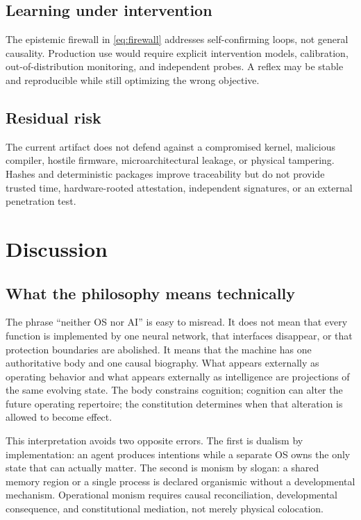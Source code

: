 \documentclass[journal,10pt]{IEEEtran}
\begin{document}
\subsection{Learning under intervention}
The epistemic firewall in \eqref{eq:firewall} addresses self-confirming loops, not general causality. Production use would require explicit intervention models, calibration, out-of-distribution monitoring, and independent probes. A reflex may be stable and reproducible while still optimizing the wrong objective.

\subsection{Residual risk}
The current artifact does not defend against a compromised kernel, malicious compiler, hostile firmware, microarchitectural leakage, or physical tampering. Hashes and deterministic packages improve traceability but do not provide trusted time, hardware-rooted attestation, independent signatures, or an external penetration test.

\section{Discussion}
\subsection{What the philosophy means technically}
The phrase ``neither OS nor AI'' is easy to misread. It does not mean that every function is implemented by one neural network, that interfaces disappear, or that protection boundaries are abolished. It means that the machine has one authoritative body and one causal biography. What appears externally as operating behavior and what appears externally as intelligence are projections of the same evolving state. The body constrains cognition; cognition can alter the future operating repertoire; the constitution determines when that alteration is allowed to become effect.

This interpretation avoids two opposite errors. The first is dualism by implementation: an agent produces intentions while a separate OS owns the only state that can actually matter. The second is monism by slogan: a shared memory region or a single process is declared organismic without a developmental mechanism. Operational monism requires causal reconciliation, developmental consequence, and constitutional mediation, not merely physical colocation.
\end{document}

